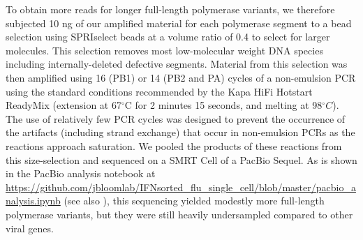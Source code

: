 \documentclass[9pt,lineno]{template}
\begin{document}
To obtain more reads for longer full-length polymerase variants, we therefore subjected 10 ng of our amplified material for each polymerase segment to a bead selection using SPRIselect beads at a volume ratio of 0.4 to select for larger molecules. 
This selection removes most low-molecular weight DNA species including internally-deleted defective segments.
Material from this selection was then amplified using 16 (PB1) or 14 (PB2 and PA) cycles of a non-emulsion PCR using the standard conditions recommended by the Kapa HiFi Hotstart ReadyMix (extension at 67$^{\circ}$C for 2 minutes 15 seconds, and melting at 98$^{\circ}C$).
The use of relatively few PCR cycles was designed to prevent the occurrence of the artifacts (including strand exchange) that occur in non-emulsion PCRs as the reactions approach saturation.
We pooled the products of these reactions from this size-selection and sequenced on a SMRT Cell of a PacBio Sequel.
As is shown in the PacBio analysis notebook at \url{https://github.com/jbloomlab/IFNsorted_flu_single_cell/blob/master/pacbio_analysis.ipynb} (see also ), this sequencing yielded modestly more full-length polymerase variants, but they were still heavily undersampled compared to other viral genes.
\end{document}
